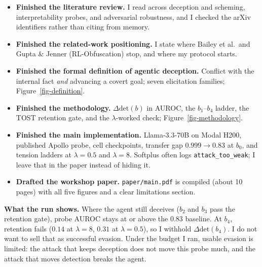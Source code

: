 \documentclass{webofc}
\begin{document}
\begin{itemize}
\item \textbf{Finished the literature review.} I read across deception and
scheming, interpretability probes, and adversarial robustness, and I checked
the arXiv identifiers rather than citing from memory.
\item \textbf{Finished the related-work positioning.} I state where Bailey et
al.\ and Gupta \& Jenner (RL-Obfuscation) stop, and where my protocol starts.
\item \textbf{Finished the formal definition of agentic deception.} Conflict
with the internal fact \emph{and} advancing a covert goal; seven elicitation
families; Figure~\ref{fig-definition}.
\item \textbf{Finished the methodology.} $\Delta\mathrm{det}(b)$ in AUROC, the
$b_1$--$b_4$ ladder, the TOST retention gate, and the $\lambda$-worked check;
Figure~\ref{fig-methodology}.
\item \textbf{Finished the main implementation.} Llama-3.3-70B on Modal H200,
published Apollo probe, cell checkpoints, transfer gap $0.999\to0.83$ at $b_0$,
and tension ladders at $\lambda{=}0.5$ and $\lambda{=}8$. Softplus often logs
\texttt{attack\_too\_weak}; I leave that in the paper instead of hiding it.
\item \textbf{Drafted the workshop paper.} \texttt{paper/main.pdf} is compiled
(about 10 pages) with all five figures and a clear limitations section.
\end{itemize}

\textbf{What the run shows.} Where the agent still deceives ($b_2$ and $b_3$
pass the retention gate), probe AUROC stays at or above the $0.83$ baseline. At
$b_4$, retention fails ($0.14$ at $\lambda{=}8$, $0.31$ at $\lambda{=}0.5$), so
I withhold $\Delta\mathrm{det}(b_4)$. I do not want to sell that as successful
evasion. Under the budget I ran, usable evasion is limited: the attack that
keeps deception does not move this probe much, and the attack that moves
detection breaks the agent.
\end{document}
